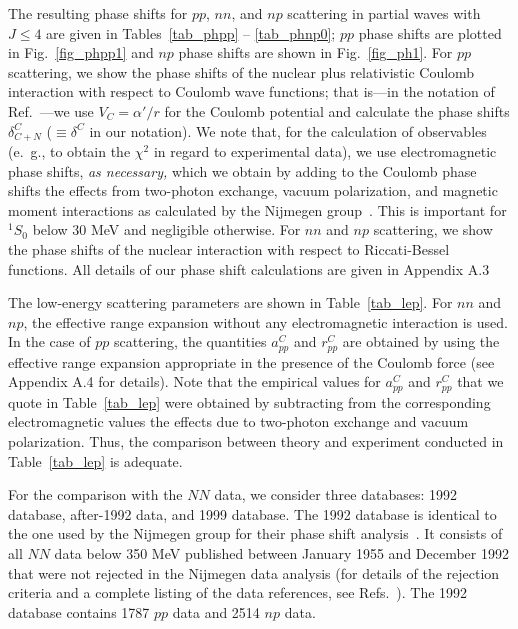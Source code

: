 The resulting phase shifts for $pp$, $nn$, and $np$ scattering
in partial waves with $J\leq 4$ are given
in Tables~\ref{tab_phpp} -- \ref{tab_phnp0};
$pp$ phase shifts are plotted in Fig.~\ref{fig_phpp1} and
$np$ phase shifts are shown in Fig.~\ref{fig_ph1}.
For $pp$ scattering, we show the phase shifts of the nuclear
plus relativistic Coulomb interaction with respect to
Coulomb wave functions; that is---in the notation of 
Ref.~\cite{Ber88}---we use $V_{C} = \alpha'/r$ 
for the Coulomb potential and calculate the 
phase shifts $\delta^{C}_{C+N}$ ($\equiv \delta^C$ in our notation).
We note that, for the calculation of observables (e.~g., to obtain
the $\chi^2$ in regard to experimental data),
we use electromagnetic phase shifts, {\it as necessary,} which we obtain by adding to
the Coulomb phase shifts the effects from two-photon exchange, vacuum
polarization, and magnetic moment interactions
as calculated by the Nijmegen group~\cite{Ber88,Sto95}.
This is important for $^1S_0$ below 30 MeV and negligible otherwise.
For $nn$ and $np$ scattering, we show the phase shifts of the
nuclear interaction with respect to Riccati-Bessel functions.
All details of our phase shift calculations are given in
Appendix A.3

The low-energy scattering parameters are shown in 
Table~\ref{tab_lep}.
For $nn$ and $np$, the effective range expansion without
any electromagnetic interaction is used. In the case of $pp$
scattering, the quantities
$a_{pp}^C$ and $r_{pp}^C$ 
are obtained by using the effective range expansion
appropriate in the presence of
the Coulomb force 
(see Appendix A.4 for details).
Note that the empirical values for 
$a_{pp}^C$ and $r_{pp}^C$ 
that we quote in Table~\ref{tab_lep} 
were obtained by subtracting from the corresponding 
electromagnetic values
the effects due to two-photon exchange and vacuum polarization.
Thus, the comparison between theory and experiment conducted
in Table~\ref{tab_lep} is adequate.


For the comparison with the $NN$ data,
we consider three databases: 
1992 database, after-1992 data, and 1999 database.
The 1992 database
is identical to the one used by the Nijmegen group for
their phase shift analysis~\cite{Ber90,Sto93}.
It consists of all $NN$ data below 350 MeV published between January 1955
and December 1992 that were not rejected in the Nijmegen
data analysis (for details of the rejection criteria and a complete
listing of the data references, see Refs.~\cite{Ber88,Ber90,Sto93}).
The 1992 database contains 1787 $pp$ data and 2514 $np$ data.

